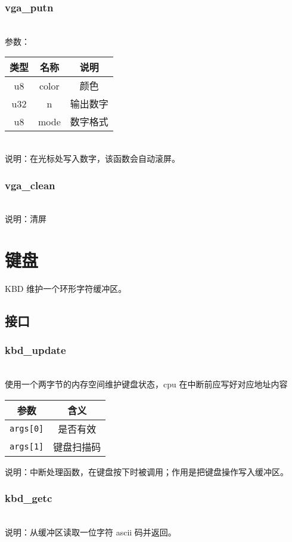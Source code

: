 \subsubsection{vga\_putn}
\\
参数：\\
\begin{tabular}{|c|c|c|}
    \hline
    类型 & 名称 & 说明\\\hline
    u8 & color & 颜色\\\hline
    u32 & n & 输出数字\\\hline
    u8 & mode & 数字格式\\\hline
\end{tabular}\\
说明：在光标处写入数字，该函数会自动滚屏。

\subsubsection{vga\_clean}
\\
说明：清屏

\section{键盘}
KBD 维护一个环形字符缓冲区。

\subsection{接口}

\subsubsection{kbd\_update}
\\

使用一个两字节的内存空间维护键盘状态，cpu 在中断前应写好对应地址内容

\begin{tabular}{|c|c|}
    \hline
    参数 & 含义 \\\hline
    \texttt{args[0]} & 是否有效 \\\hline
    \texttt{args[1]} & 键盘扫描码 \\\hline
\end{tabular}

说明：中断处理函数，在键盘按下时被调用；作用是把键盘操作写入缓冲区。

\subsubsection{kbd\_getc}
\\
说明：从缓冲区读取一位字符 ascii 码并返回。
